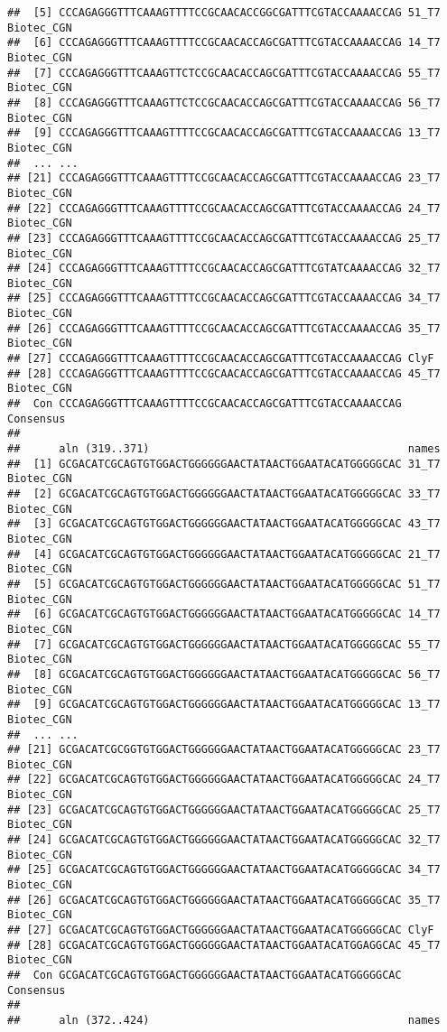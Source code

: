 \documentclass[
]{article}
\begin{document}
\begin{verbatim}
##  [5] CCCAGAGGGTTTCAAAGTTTTCCGCAACACCGGCGATTTCGTACCAAAACCAG 51_T7 Biotec_CGN
##  [6] CCCAGAGGGTTTCAAAGTTTTCCGCAACACCAGCGATTTCGTACCAAAACCAG 14_T7 Biotec_CGN
##  [7] CCCAGAGGGTTTCAAAGTTCTCCGCAACACCAGCGATTTCGTACCAAAACCAG 55_T7 Biotec_CGN
##  [8] CCCAGAGGGTTTCAAAGTTCTCCGCAACACCAGCGATTTCGTACCAAAACCAG 56_T7 Biotec_CGN
##  [9] CCCAGAGGGTTTCAAAGTTTTCCGCAACACCAGCGATTTCGTACCAAAACCAG 13_T7 Biotec_CGN 
##  ... ...
## [21] CCCAGAGGGTTTCAAAGTTTTCCGCAACACCAGCGATTTCGTACCAAAACCAG 23_T7 Biotec_CGN
## [22] CCCAGAGGGTTTCAAAGTTTTCCGCAACACCAGCGATTTCGTACCAAAACCAG 24_T7 Biotec_CGN
## [23] CCCAGAGGGTTTCAAAGTTTTCCGCAACACCAGCGATTTCGTACCAAAACCAG 25_T7 Biotec_CGN
## [24] CCCAGAGGGTTTCAAAGTTTTCCGCAACACCAGCGATTTCGTATCAAAACCAG 32_T7 Biotec_CGN
## [25] CCCAGAGGGTTTCAAAGTTTTCCGCAACACCAGCGATTTCGTACCAAAACCAG 34_T7 Biotec_CGN
## [26] CCCAGAGGGTTTCAAAGTTTTCCGCAACACCAGCGATTTCGTACCAAAACCAG 35_T7 Biotec_CGN
## [27] CCCAGAGGGTTTCAAAGTTTTCCGCAACACCAGCGATTTCGTACCAAAACCAG ClyF
## [28] CCCAGAGGGTTTCAAAGTTTTCCGCAACACCAGCGATTTCGTACCAAAACCAG 45_T7 Biotec_CGN
##  Con CCCAGAGGGTTTCAAAGTTTTCCGCAACACCAGCGATTTCGTACCAAAACCAG Consensus 
## 
##      aln (319..371)                                        names
##  [1] GCGACATCGCAGTGTGGACTGGGGGGAACTATAACTGGAATACATGGGGGCAC 31_T7 Biotec_CGN
##  [2] GCGACATCGCAGTGTGGACTGGGGGGAACTATAACTGGAATACATGGGGGCAC 33_T7 Biotec_CGN
##  [3] GCGACATCGCAGTGTGGACTGGGGGGAACTATAACTGGAATACATGGGGGCAC 43_T7 Biotec_CGN
##  [4] GCGACATCGCAGTGTGGACTGGGGGGAACTATAACTGGAATACATGGGGGCAC 21_T7 Biotec_CGN
##  [5] GCGACATCGCAGTGTGGACTGGGGGGAACTATAACTGGAATACATGGGGGCAC 51_T7 Biotec_CGN
##  [6] GCGACATCGCAGTGTGGACTGGGGGGAACTATAACTGGAATACATGGGGGCAC 14_T7 Biotec_CGN
##  [7] GCGACATCGCAGTGTGGACTGGGGGGAACTATAACTGGAATACATGGGGGCAC 55_T7 Biotec_CGN
##  [8] GCGACATCGCAGTGTGGACTGGGGGGAACTATAACTGGAATACATGGGGGCAC 56_T7 Biotec_CGN
##  [9] GCGACATCGCAGTGTGGACTGGGGGGAACTATAACTGGAATACATGGGGGCAC 13_T7 Biotec_CGN 
##  ... ...
## [21] GCGACATCGCGGTGTGGACTGGGGGGAACTATAACTGGAATACATGGGGGCAC 23_T7 Biotec_CGN
## [22] GCGACATCGCAGTGTGGACTGGGGGGAACTATAACTGGAATACATGGGGGCAC 24_T7 Biotec_CGN
## [23] GCGACATCGCAGTGTGGACTGGGGGGAACTATAACTGGAATACATGGGGGCAC 25_T7 Biotec_CGN
## [24] GCGACATCGCAGTGTGGACTGGGGGGAACTATAACTGGAATACATGGGGGCAC 32_T7 Biotec_CGN
## [25] GCGACATCGCAGTGTGGACTGGGGGGAACTATAACTGGAATACATGGGGGCAC 34_T7 Biotec_CGN
## [26] GCGACATCGCAGTGTGGACTGGGGGGAACTATAACTGGAATACATGGGGGCAC 35_T7 Biotec_CGN
## [27] GCGACATCGCAGTGTGGACTGGGGGGAACTATAACTGGAATACATGGGGGCAC ClyF
## [28] GCGACATCGCAGTGTGGACTGGGGGGAACTATAACTGGAATACATGGAGGCAC 45_T7 Biotec_CGN
##  Con GCGACATCGCAGTGTGGACTGGGGGGAACTATAACTGGAATACATGGGGGCAC Consensus 
## 
##      aln (372..424)                                        names

\end{verbatim}
\end{document}
